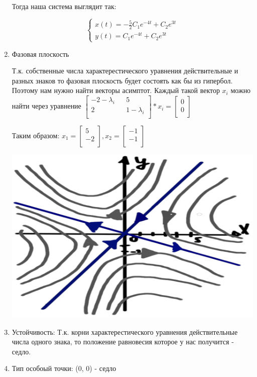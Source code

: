 \begin{enumerate}
    Тогда наша система выглядит так:

    \begin{equation*}
     \begin{cases}
       x(t) = -\frac{5}{2} C_1 e^{-4t} + C_2 e^{3t}
       \\
       y(t) = C_1 e^{-4t} + C_2 e^{3t}
     \end{cases}
    \end{equation*}
      

    \item Фазовая плоскость

    Т.к. собственные числа характерестического уравнения действительные и разных знаков то фазовая плоскость будет состоять
     как бы из гипербол. Поэтому нам нужно найти векторы асимптот. Каждый такой вектор $x_i$ можно найти через уравнение
     $\displaystyle \begin{bmatrix}
        -2 - \lambda_i && 5 \\
        2 && 1 - \lambda_i \\
   \end{bmatrix} * x_i = 
   \begin{bmatrix}
    0 \\
    0 \\
\end{bmatrix} 
   $

   Таким образом: $
   x_1 = 
   \begin{bmatrix}
    5 \\
    -2 \\
\end{bmatrix} ,
x_2 = 
\begin{bmatrix}
    -1 \\
    -1 \\
\end{bmatrix} 
   $

   \includegraphics[scale=0.2]{ss34task.png}

    \item Устойчивость: Т.к. корни характерестического уравнения действительные числа одного знака, то
    положение равновесия которое у нас получится - седло.
    \item Тип особоый точки: (0, 0) - седло
\end{enumerate}

